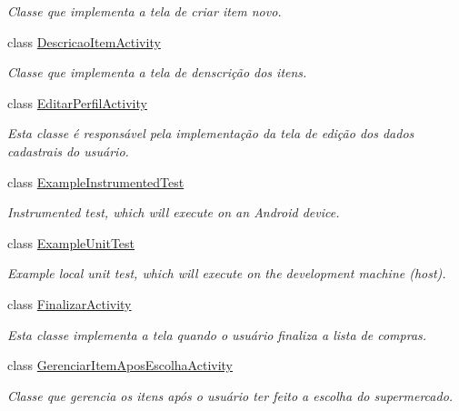 \begin{DoxyCompactItemize}
\begin{DoxyCompactList}\small\item\em Classe que implementa a tela de criar item novo. \end{DoxyCompactList}\item 
class \mbox{\hyperlink{classbr_1_1unb_1_1cic_1_1mp_1_1marketmaster_1_1DescricaoItemActivity}{Descricao\+Item\+Activity}}
\begin{DoxyCompactList}\small\item\em Classe que implementa a tela de denscrição dos itens. \end{DoxyCompactList}\item 
class \mbox{\hyperlink{classbr_1_1unb_1_1cic_1_1mp_1_1marketmaster_1_1EditarPerfilActivity}{Editar\+Perfil\+Activity}}
\begin{DoxyCompactList}\small\item\em Esta classe é responsável pela implementação da tela de edição dos dados cadastrais do usuário. \end{DoxyCompactList}\item 
class \mbox{\hyperlink{classbr_1_1unb_1_1cic_1_1mp_1_1marketmaster_1_1ExampleInstrumentedTest}{Example\+Instrumented\+Test}}
\begin{DoxyCompactList}\small\item\em Instrumented test, which will execute on an Android device. \end{DoxyCompactList}\item 
class \mbox{\hyperlink{classbr_1_1unb_1_1cic_1_1mp_1_1marketmaster_1_1ExampleUnitTest}{Example\+Unit\+Test}}
\begin{DoxyCompactList}\small\item\em Example local unit test, which will execute on the development machine (host). \end{DoxyCompactList}\item 
class \mbox{\hyperlink{classbr_1_1unb_1_1cic_1_1mp_1_1marketmaster_1_1FinalizarActivity}{Finalizar\+Activity}}
\begin{DoxyCompactList}\small\item\em Esta classe implementa a tela quando o usuário finaliza a lista de compras. \end{DoxyCompactList}\item 
class \mbox{\hyperlink{classbr_1_1unb_1_1cic_1_1mp_1_1marketmaster_1_1GerenciarItemAposEscolhaActivity}{Gerenciar\+Item\+Apos\+Escolha\+Activity}}
\begin{DoxyCompactList}\small\item\em Classe que gerencia os itens após o usuário ter feito a escolha do supermercado. \end{DoxyCompactList}\item 

\end{DoxyCompactItemize}
